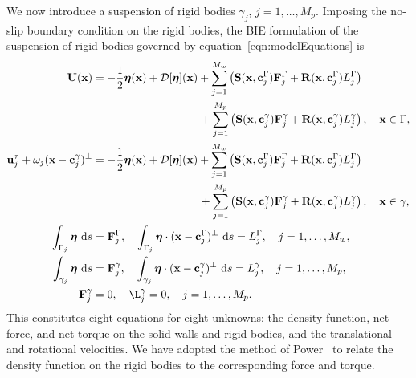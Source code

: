 \documentclass[preprint, 10pt]{elsarticle}
\begin{document}
We now introduce a suspension of rigid bodies $\gamma_j$,
$j=1,\ldots,M_p$.  Imposing the no-slip boundary condition on the rigid
bodies, the BIE formulation of the suspension of rigid bodies governed
by equation~\eqref{eqn:modelEquations} is
\begin{subequations}
  \label{eqn:BIEformulation}
  \begin{align}
    \UU(\xx) &= -\frac{1}{2}\eeta(\xx) + \DD[\eeta](\xx) +
    \sum_{j=1}^{M_w} \left(\mathbf{S}(\xx,\cc^\Gamma_j)\FF^\Gamma_j + 
      \mathbf{R}(\xx,\cc^\Gamma_j)L^\Gamma_j\right)  \nonumber \\
      &\hspace{96pt}+\sum_{j=1}^{M_p} \left(\mathbf{S}(\xx,\cc^\gamma_j)\FF^\gamma_j + 
      \mathbf{R}(\xx,\cc^\gamma_j)L^\gamma_j\right), 
    \quad \xx \in \Gamma, \label{eqn:BIEformulation1} \\
  \uu^\tau_j + \omega_j(\xx - \cc_j^\gamma)^\perp &=
    -\frac{1}{2}\eeta(\xx) + \DD[\eeta](\xx) + 
    \sum_{j=1}^{M_w} \left(\mathbf{S}(\xx,\cc^\Gamma_j)\FF^\Gamma_j + 
      \mathbf{R}(\xx,\cc^\Gamma_j)L^\Gamma_j\right) \nonumber \\
    &\hspace{96pt}+\sum_{j=1}^{M_p} \left(\mathbf{S}(\xx,\cc^\gamma_j)\FF^\gamma_j + 
      \mathbf{R}(\xx,\cc^\gamma_j)L^\gamma_j\right), 
    \quad \xx \in \gamma, \label{eqn:BIEformulation2} \\
  \int_{\Gamma_j} \eeta~\text{d}s &= \FF^\Gamma_j, \quad
  \int_{\Gamma_j} \eeta\cdot (\xx - \cc^\Gamma_j)^\perp~\text{d}s =
  L^\Gamma_j, \quad j=1,\ldots,M_w, \label{eqn:BIEformulation3} \\
  \int_{\gamma_j} \eeta~\text{d}s &= \FF^\gamma_j, \quad
  \int_{\gamma_j} \eeta\cdot (\xx - \cc^\gamma_j)^\perp~\text{d}s =
  L^\gamma_j,\quad j=1,\ldots,M_p, \label{eqn:BIEformulation4} \\
  \FF^\gamma_j &= 0, \quad \L^\gamma_j = 0,\quad j=1,\ldots,M_p.
  \label{eqn:BIEformulation5}
\end{align}
\end{subequations}
This constitutes eight equations for eight unknowns: the density
function, net force, and net torque on the solid walls and rigid bodies,
and the translational and rotational velocities.  We have adopted the
method of Power~\cite{Power1993} to relate the density function on the
rigid bodies to the corresponding force and torque.
\end{document}
